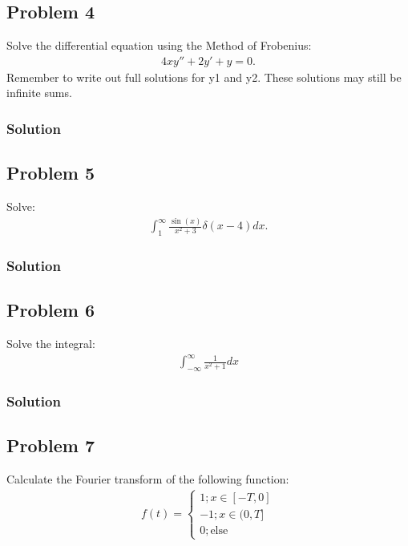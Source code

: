 \subsection*{Problem 4}
Solve the differential equation using the Method of Frobenius:
\begin{align*}
    4xy'' + 2y' +y = 0.
\end{align*}Remember to write out full solutions for y1 and y2. These solutions may still be infinite sums.

\subsubsection*{Solution}

\subsection*{Problem 5}
Solve:
\begin{align*}
    \int_{1}^{\infty}\frac{\sin(x)}{x^2 + 3}\delta(x - 4)dx.
\end{align*}

\subsubsection*{Solution}

\subsection*{Problem 6}
Solve the integral:
\begin{align*}
    \int_{-\infty}^\infty \frac{1}{x^2 + 1}dx
\end{align*}

\subsubsection*{Solution}

\subsection*{Problem 7}
Calculate the Fourier transform of the following function:
\begin{align*}
    f(t) =\begin{cases}
        1; x\in[-T, 0]\\
        -1; x\in(0,T]\\
        0; \text{else}
    \end{cases}
\end{align*}

